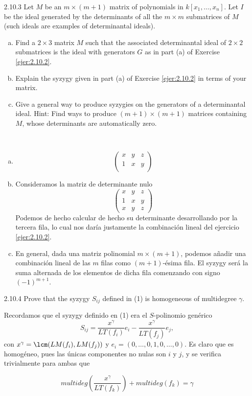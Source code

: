 \documentclass[twoside]{article}
\begin{document}
\begin{ejercicio}{2.10.3}
Let $M$ be an $m × (m + 1)$ matrix of polynomials in $k[x_1, \dots , x_n]$. Let $I$ be the ideal generated
by the determinants of all the $m × m$ submatrices of $M$ (such ideals are examples
of determinantal ideals).
\begin{enumerate}[a.]
\item Find a $2×3$ matrix $M$ such that the associated determinantal ideal of $2×2$ submatrices
is the ideal with generators $G$ as in part (a) of Exercise \ref{ejer:2.10.2}.
\item Explain the syzygy given in part (a) of Exercise \ref{ejer:2.10.2} in terms of your matrix.
\item Give a general way to produce syzygies on the generators of a determinantal ideal.
Hint: Find ways to produce $(m + 1) × (m + 1)$ matrices containing $M$, whose determinants
are automatically zero.
\end{enumerate}
\end{ejercicio}
\begin{solucion}\
\begin{enumerate}[a.]
\item 
\[
\begin{pmatrix}
 x& y & z\\
 1& x & y \\
\end{pmatrix}
\]

\item Consideramos la matriz de determinante nulo
\[
\begin{pmatrix}
 x& y & z\\
 1& x & y \\
 x &y & z
\end{pmatrix}
\]
Podemos de hecho calcular de hecho su determinante desarrollando por la tercera fila, lo cual nos daría justamente la combinación lineal del ejercicio \ref{ejer:2.10.2}.

\item En general, dada una matriz polinomial $m\times (m+1)$, podemos añadir una combinación lineal de las $m$ filas como $(m+1)$-ésima fila. El syzygy será la suma alternada de los elementos de dicha fila comenzando con signo $(-1)^{m+1}$.
\end{enumerate}
\end{solucion}

\newpage

\begin{ejercicio}{2.10.4}
Prove that the syzygy $S_{ij}$ defined in (1) is homogeneous of multidegree $γ$.
\end{ejercicio}
\begin{solucion}
Recordamos que el syzygy definido en (1) era el $S$-polinomio genérico
\[
S_{ij}=\frac{x^\gamma}{LT(f_i)}e_i-\frac{x^\gamma}{LT(f_j)}e_j,
\]
con $x^\gamma=\lcm(LM(f_i),LM(f_j))$ y $e_i=(0,\dots,0,1,0,\dots, 0)$. Es claro que es homogéneo, pues las únicas componentes no nulas son $i$ y $j$, y se verifica trivialmente para ambas que

$$
multideg\left(\frac{x^\gamma}{LT(f_k)}\right)+multideg(f_k)=\gamma
$$
\end{solucion}
\newpage
\end{document}
